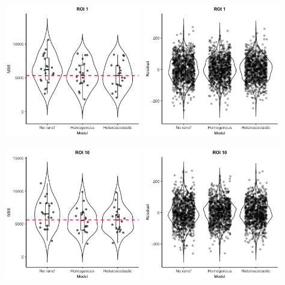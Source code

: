  \includegraphics[width=0.45\textwidth]{ROI1_voilin.png}
 \includegraphics[width=0.45\textwidth]{ROI1_voilin_resi.png}
 
\includegraphics[width=0.45\textwidth]{ROI10_voilin.png}
\includegraphics[width=0.45\textwidth]{ROI10_voilin_resi.png}

